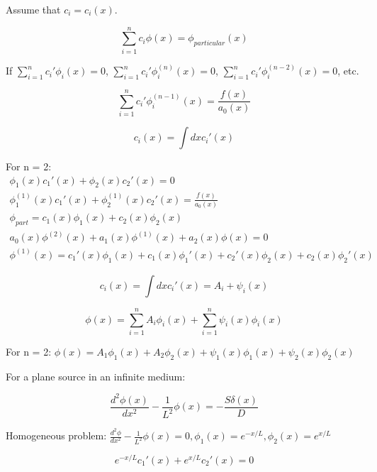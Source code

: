 \documentclass[12pt]{article}
\begin{document}
Assume that $c_i = c_i(x)$.

\begin{equation*}
\sum_{i=1}^n c_i\phi(x) = \phi_{particular}(x)
\end{equation*}

If $\sum_{i=1}^n c_i'\phi_i(x) = 0$, $\sum_{i=1}^n c_i'\phi^{(n)}_i(x) = 0$, 
$\sum_{i=1}^n c_i'\phi^{(n-2)}_i(x) = 0$, etc.

\begin{equation*}
\sum_{i=1}^n c_i'\phi^{(n-1)}_i(x) = \frac{f(x)}{a_0(x)}
\end{equation*}

\begin{equation*}
c_i(x) = \int dxc_i'(x)
\end{equation*}

For n = 2:
\vspace{-5 mm}
\begin{gather*}
\phi_1(x)c_1'(x) + \phi_2(x)c_2'(x) = 0 \\
\phi_1^{(1)}(x)c_1'(x) + \phi_2^{(1)}(x)c_2'(x) = \frac{f(x)}{a_0(x)} \\
\phi_{part} = c_1(x)\phi_1(x) + c_2(x)\phi_2(x) \\
a_0(x)\phi^{(2)}(x) + a_1(x)\phi^{(1)}(x) + a_2(x)\phi(x) = 0 \\
\phi^{(1)}(x) = c_1'(x)\phi_1(x) + c_1(x)\phi_1'(x) + c_2'(x)\phi_2(x) + c_2(x)\phi_2'(x)
\end{gather*}

\begin{equation*}
c_i(x) = \int dx c_i'(x) = A_i + \psi_i(x)
\end{equation*}

\begin{equation*}
\phi(x) = \sum_{i=1}^n A_i\phi_i(x) + \sum_{i=1}^n \psi_i(x)\phi_i(x)
\end{equation*}

For n = 2: $\phi(x) = A_1\phi_1(x) + A_2\phi_2(x) + \psi_1(x)\phi_1(x) + \psi_2(x)\phi_2(x)$


For a plane source in an infinite medium:

\begin{equation*}
\frac{d^2\phi(x)}{dx^2} - \frac{1}{L^2}\phi(x) = -\frac{S\delta(x)}{D}
\end{equation*}

Homogeneous problem: $\frac{d^2\phi}{dx^2} - \frac{1}{L^2}\phi(x)=0,\phi_1(x)=e^{-x/L},\phi_2(x)=e^{x/L}$

\begin{equation*}
e^{-x/L}c_1'(x) + e^{x/L}c_2'(x) = 0
\end{equation*}
\end{document}
